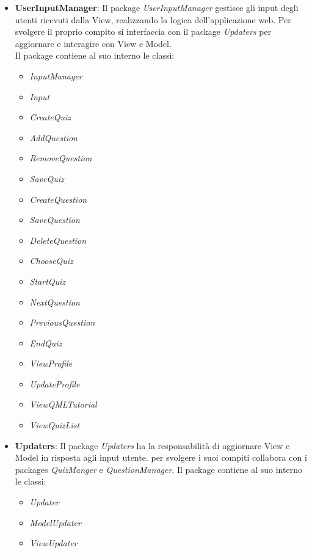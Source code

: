 \documentclass[a4paper,11pt]{article}
\begin{document}
	\begin{itemize}
	\item \textbf{UserInputManager}:
	Il package \emph{UserInputManager} gestisce gli input degli utenti ricevuti dalla View, realizzando la logica dell'applicazione web. Per svolgere il proprio compito si interfaccia con il package \emph{Updaters} per aggiornare e interagire con View e Model. \\
	Il package contiene al suo interno le classi:
	\begin{itemize}
		\item \textit{InputManager}
		\item \textit{Input}
		\item\textit{CreateQuiz}
		\item\textit{AddQuestion}
		\item\textit{RemoveQuestion}
		\item\textit{SaveQuiz}
		\item\textit{CreateQuestion}
		\item\textit{SaveQuestion}
		\item\textit{DeleteQuestion}
		\item\textit{ChooseQuiz}
		\item\textit{StartQuiz}
		\item\textit{NextQuestion}
		\item\textit{PreviousQuestion}
		\item\textit{EndQuiz}
		\item\textit{ViewProfile}
		\item\textit{UpdateProfile}
		\item\textit{ViewQMLTutorial}
		\item\textit{ViewQuizList}
	\end{itemize}	
	\item \textbf{Updaters}:
	Il package \emph{Updaters} ha la responsabilità di aggiornare View e Model in risposta agli input utente. per svolgere i suoi compiti collabora con i packages \emph{QuizManger} e \emph{QuestionManager}. Il package contiene al suo interno le classi:
	\begin{itemize}
		\item \textit{Updater}
		\item \textit{ModelUpdater}
		\item \textit{ViewUpdater}
	\end{itemize}
	

\end{itemize}
\end{document}
